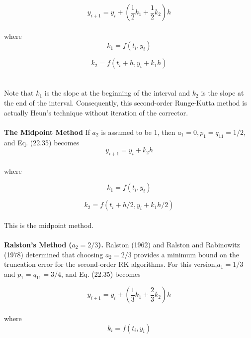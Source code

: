 \documentclass[../main.tex]{subfiles}
\begin{document}
\begin{equation}
\tag{22.41}
y_{i+1} = y_{i} + \left( \dfrac{1}{2}k_{1} + \dfrac{1}{2}k_{2} \right) h
\end{equation}\\
where
\begin{equation}
\tag{22.41a}
k_{1} = f(t_{i}, y_{i})
\end{equation}

\begin{equation}
\tag{22.41b}
k_{2} = f(t_{i} + h, y_{i} + k_{1}h)
\end{equation}\\
\\
Note that $k_1$ is the slope at the beginning of the interval and $k_2$ is the slope at the end of the
interval. Consequently, this second-order Runge-Kutta method is actually Heun's technique without iteration of the corrector.\\
\\
\textbf{The Midpoint Method}  If $a_{2}$ is assumed to be 1, then $a_1 = 0, p_1 = q_{11} = 1/2$, and Eq. (22.35) becomes
\begin{equation}
\tag{22.42}
y_{i+1} = y_i + k_2h 
\end{equation}\\
where

\begin{equation}
\tag{22.42a}
k_1 = f(t_i,y_i)
\end{equation}

\begin{equation}
\tag{22.42b}
k_2 = f(t_i + h/2, y_i + k_1h/2)
\end{equation}\\
This is the midpoint method.\\
\\
\textbf{Ralston's Method} \textbf{($a_2 = 2/3$).} Ralston (1962) and Ralston and Rabinowitz (1978) determined that choosing $a_2 = 2/3$ provides a minimum bound on the truncation error for
the second-order RK algorithms. For this version,$a_1 = 1/3$ and $p_1 = q_{11} = 3/4$, and Eq. (22.35) becomes

\begin{equation}
\tag{22.43}
y_{i+1} = y_i + \left(\dfrac{1}{3} k_1 + \dfrac{2}{3}k_2 \right)h
\end{equation}\\
where
\begin{equation}
\tag{22.43a}
k_i = f(t_i, y_i)
\end{equation}
\end{document}
